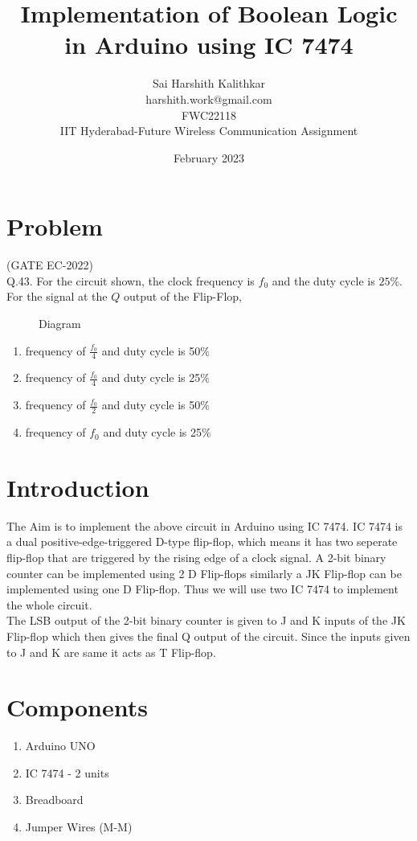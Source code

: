 \documentclass{article}
\title{Implementation of Boolean Logic in Arduino using IC 7474}
\date{February 2023}
\author{Sai Harshith Kalithkar\\harshith.work@gmail.com\\FWC22118\\IIT Hyderabad-Future Wireless Communication Assignment}
\begin{document}
\maketitle
	\tableofcontents
\pagebreak
\section{Problem}
	(GATE EC-2022)\\
	Q.43. For the circuit shown, the clock frequency is $f_0$ and the duty cycle is $25 \%$. For the signal at the $Q$ output of the Flip-Flop,
\\
\begin{figure}[h]

	\caption{Diagram}
	\label{fig:1}
\end{figure}

\begin{enumerate}
	\item frequency of $\frac{f_0}{4}$ and duty cycle is 50$\%$
	\item frequency of $\frac{f_0}{4}$ and duty cycle is 25$\%$
	\item frequency of $\frac{f_0}{2}$ and duty cycle is 50$\%$
	\item frequency of $f_0$ and duty cycle is 25$\%$ \\
\end{enumerate}

\section{Introduction}
		The Aim is to implement the above circuit in Arduino using IC 7474. IC 7474 is a dual positive-edge-triggered D-type flip-flop, which means it has two seperate flip-flop that are triggered by the rising edge of a clock signal. A 2-bit binary counter can be implemented using 2 D Flip-flops similarly a JK Flip-flop can be implemented using one D Flip-flop. Thus we will use two IC 7474 to implement the whole circuit.\\

		The LSB output of the 2-bit binary counter is given to J and K inputs of the JK Flip-flop which then gives the final Q output of the circuit. Since the inputs given to J and K are same it acts as T Flip-flop.\\
\section{Components}
	\begin{enumerate}
		\item Arduino UNO
		\item IC 7474 - 2 units
		\item Breadboard
		\item Jumper Wires (M-M) \\
	\end{enumerate}
\end{document}
